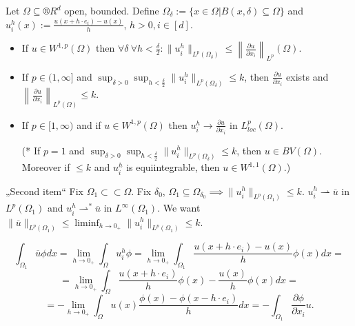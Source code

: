 \documentclass[12pt]{article}					%
\begin{document}
\begin{veta}
	Let $\Omega \subseteq ®R^d$ open, bounded. Define $\Omega_\delta := \{x \in \Omega | B(x, \delta) \subseteq \Omega\}$ and $u_i^h(x) := \frac{u(x + h·e_i) - u(x)}{h}$, $h > 0, i \in [d]$.

	\begin{itemize}
		\item If $u \in W^{1, p}(\Omega)$ then $\forall \delta\ \forall h < \frac{\delta}{2}: \|u_i^h\|_{L^p(\Omega_\delta)} ≤ \left\|\frac{\partial u}{\partial x_i}\right\|_{L^p}(\Omega)$.
		\item If $p \in (1, ∞]$ and $\sup_{\delta > 0} \sup_{h < \frac{\delta}{2}} \|u_i^h\|_{L^p(\Omega_\delta)} ≤ k$, then $\frac{\partial u}{\partial x_i}$ exists and $\left\|\frac{\partial u}{\partial x_i}\right\|_{L^p(\Omega)} ≤ k$.
		\item If $p \in [1, ∞)$ and if $u \in W^{1, p}(\Omega)$ then $u_i^h \rightarrow \frac{\partial u}{\partial x_i}$ in $L_{loc}^p(\Omega)$.
		\item[(*] If $p = 1$ and $\sup_{\delta > 0} \sup_{h < \frac{\delta}{2}} \|u_i^h\|_{L^p(\Omega_\delta)} ≤ k$, then $u \in BV(\Omega)$. Moreover if $≤k$ and $u_i^h$ is equiintegrable, then $u \in W^{1, 1}(\Omega)$.)
	\end{itemize}

	\begin{dukazin}
		„Second item“ Fix $\Omega_1 \subset\subset \Omega$. Fix $\delta_0$, $\Omega_1 \subseteq \Omega_{\delta_0} \implies \|u_i^h\|_{L^p(\Omega_1)} ≤ k$. $u_i^h \rightharpoonup \overline u$ in $L^p(\Omega_1)$ and $u_i^h \rightharpoonup^* \overline u$ in $L^∞(\Omega_1)$.
		We want $\|\overline{u}\|_{L^p(\Omega_1)} ≤ \liminf_{h \rightarrow 0_+} \|u_i^h\|_{L^p(\Omega_1)} ≤ k$.

		$$ \int_{\Omega_1} \overline{u} \phi dx = \lim_{h \rightarrow 0_+} \int_\Omega u_i^h \phi = \lim_{h \rightarrow 0_+} \int_{\Omega_1} \frac{u(x + h·e_i) - u(x)}{h} \phi(x) dx = $$
		$$ = \lim_{h \rightarrow 0_+} \int_{\Omega} \frac{u(x + h·e_i)}{h} \phi(x) - \frac{u(x)}{h}\phi(x) dx = $$
		$$ = -\lim_{h \rightarrow 0_+} \int_{\Omega} u(x) \frac{\phi(x) - \phi(x - h·e_i)}{h} dx = -\int_{\Omega_1} \frac{\partial \phi}{\partial x_i} u. $$




\end{dukazin}
\end{veta}
\end{document}
